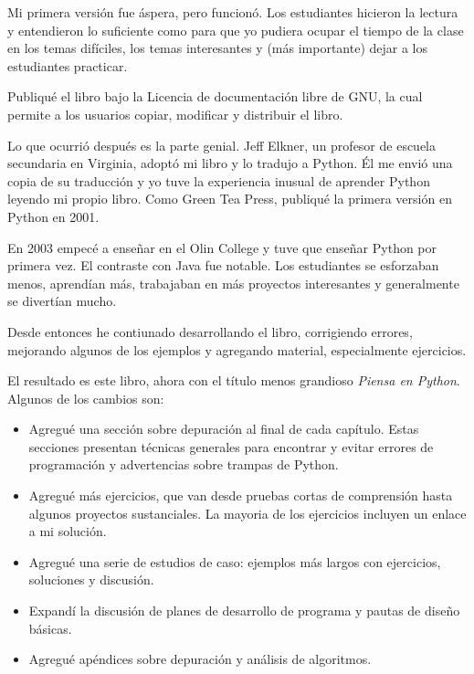 \documentclass[10pt]{book}
\begin{document}
Mi primera versión fue áspera, pero funcionó.  Los estudiantes hicieron la
lectura y entendieron lo suficiente como para que yo pudiera ocupar el tiempo
de la clase en los temas difíciles, los temas interesantes y (más importante)
dejar a los estudiantes practicar.

Publiqué el libro bajo la Licencia de documentación libre de GNU,
la cual permite a los usuarios copiar, modificar y distribuir el libro.

Lo que ocurrió después es la parte genial.  Jeff Elkner, un profesor
de escuela secundaria en Virginia, adoptó mi libro y lo tradujo a Python.
Él me envió una copia de su traducción y yo tuve la experiencia inusual de
aprender Python leyendo mi propio libro. Como Green Tea Press,
publiqué la primera versión en Python en 2001.

En 2003 empecé a enseñar en el Olin College y tuve que enseñar Python
por primera vez.  El contraste con Java fue notable.
Los estudiantes se esforzaban menos, aprendían más, trabajaban en más
proyectos interesantes y generalmente se divertían mucho.

Desde entonces he contiunado desarrollando el libro,
corrigiendo errores, mejorando algunos de los ejemplos y agregando material,
especialmente ejercicios.

El resultado es este libro, ahora con el título menos grandioso
{\em Piensa en Python}.  Algunos de los cambios son:

\begin{itemize}

\item Agregué una sección sobre depuración al final de cada capítulo.
  Estas secciones presentan técnicas generales para encontrar y evitar
  errores de programación y advertencias sobre trampas de Python.

\item Agregué más ejercicios, que van desde pruebas cortas de comprensión
  hasta algunos proyectos sustanciales.  La mayoria de los ejercicios
  incluyen un enlace a mi solución.

\item Agregué una serie de estudios de caso: ejemplos más largos con
  ejercicios, soluciones y discusión.

\item Expandí la discusión de planes de desarrollo de programa y
  pautas de diseño básicas.

\item Agregué apéndices sobre depuración y análisis de algoritmos.

\end{itemize}
\end{document}
